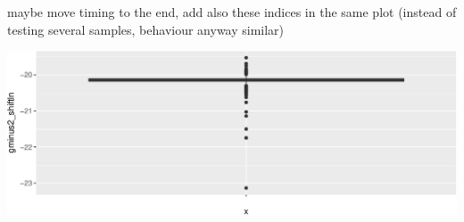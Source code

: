 \documentclass[article]{jss}
\begin{document}
maybe move timing to the end, add also these indices in the same plot
(instead of testing several samples, behaviour anyway similar)

\begin{CodeChunk}


\begin{center}\includegraphics[width=\textwidth]{figure/gminus2-box-1} \end{center}

\end{CodeChunk}
\end{document}
